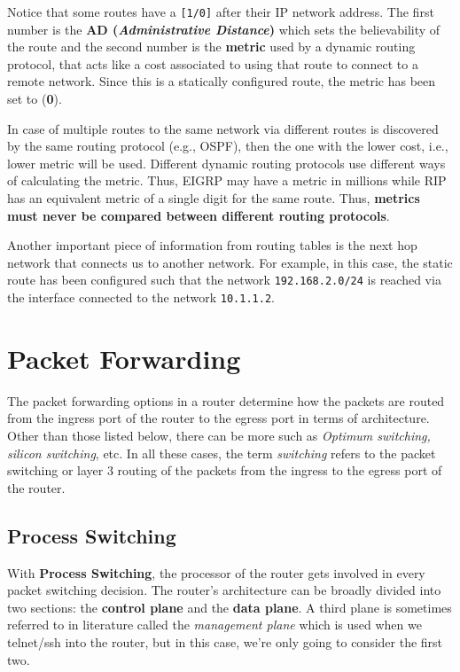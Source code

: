 \noindent
Notice that some routes have a \verb|[1/0]| after their IP network address. The first number is the \textbf{AD (\textit{Administrative Distance})} which sets the believability of the route and the second number is the \textbf{metric} used by a dynamic routing protocol, that acts like a cost associated to using that route to connect to a remote network. Since this is a statically configured route, the metric has been set to (\textbf{0}). 

In case of multiple routes to the same network via different routes is discovered by the same routing protocol (e.g., OSPF), then the one with the lower cost, i.e., lower metric will be used. Different dynamic routing protocols use different ways of calculating the metric. Thus, EIGRP may have a metric in millions while RIP has an equivalent metric of a single digit for the same route. Thus, \textbf{metrics must never be compared between different routing protocols}. 

Another important piece of information from routing tables is the next hop network that connects us to another network. For example, in this case, the static route has been configured such that the network \verb|192.168.2.0/24| is reached via the interface connected to the network \verb|10.1.1.2|. 

\section{Packet Forwarding}
The packet forwarding options in a router determine how the packets are routed from the ingress port of the router to the egress port in terms of architecture. Other than those listed below, there can be more such as \textit{Optimum switching, silicon switching}, etc. In all these cases, the term \textit{switching} refers to the packet switching or layer 3 routing of the packets from the ingress to the egress port of the router. 

\subsection{Process Switching}
With \textbf{Process Switching}, the processor of the router gets involved in every packet switching decision. The router's architecture can be broadly divided into two sections: the \textbf{control plane} and the \textbf{data plane}. A third plane is sometimes referred to in literature called the \textit{management plane} which is used when we telnet/ssh into the router, but in this case, we're only going to consider the first two. 

